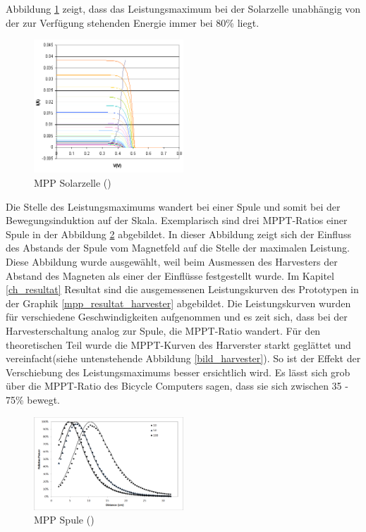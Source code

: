 Abbildung \ref{mppsolar} zeigt, dass das Leistungsmaximum bei der Solarzelle unabhängig von der zur Verfügung stehenden Energie immer bei 80\thinspace\% liegt.

\begin{figure}[ht]
    \includegraphics[width=0.5\textwidth]{2TheoretischeGrundlagen/imag/MPPSolar.png} 
    \caption{MPP Solarzelle (\cite{mpp_solar})}
    \label{mppsolar}
\end{figure}

Die Stelle des Leistungsmaximums wandert bei einer Spule und somit bei der Bewegungsinduktion auf der Skala. Exemplarisch sind drei MPPT-Ratios einer Spule in der Abbildung \ref{bildspule} abgebildet. In dieser Abbildung zeigt sich der Einfluss des Abstands der Spule vom Magnetfeld auf die Stelle der maximalen Leistung. Diese Abbildung wurde ausgewählt, weil beim Ausmessen des Harvesters der Abstand des Magneten als einer der Einflüsse festgestellt wurde. Im Kapitel \ref{ch_resultat} Resultat sind die ausgemessenen Leistungskurven des Prototypen in der Graphik \ref{mpp_resultat_harvester} abgebildet. Die Leistungskurven wurden für verschiedene Geschwindigkeiten aufgenommen und es zeit sich, dass bei der Harvesterschaltung analog zur Spule, die MPPT-Ratio wandert. Für den theoretischen Teil wurde die MPPT-Kurven des Harverster starkt geglättet und vereinfacht(siehe untenstehende Abbildung \ref{bild_harvester}). So ist der Effekt der Verschiebung des Leistungsmaximums besser ersichtlich wird. Es lässt sich grob über die MPPT-Ratio des Bicycle Computers sagen, dass sie sich zwischen 35 - 75\thinspace\% bewegt.

\begin{figure}[ht]
   \includegraphics[width=0.5\textwidth]{2TheoretischeGrundlagen/imag/MPPSpule.png}
   \caption{MPP Spule (\cite{MPP_Spule})}
   \label{bildspule} 
\end{figure}

